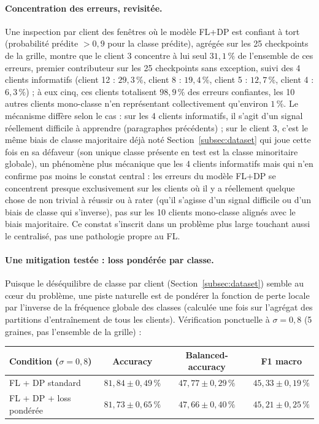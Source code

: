 \documentclass{article}
\begin{document}
\paragraph{Concentration des erreurs, revisitée.} Une inspection par client des
fenêtres où le modèle FL+DP est confiant à tort (probabilité prédite $>0{,}9$ pour la
classe prédite), agrégée sur les 25 checkpoints de la grille, montre que le client 3
concentre à lui seul $31{,}1\,\%$ de l'ensemble de ces erreurs, premier contributeur
sur les 25 checkpoints sans exception, suivi des 4 clients informatifs (client 12 :
$29{,}3\,\%$, client 8 : $19{,}4\,\%$, client 5 : $12{,}7\,\%$, client 4 : $6{,}3\,\%$) ;
à eux cinq, ces clients totalisent $98{,}9\,\%$ des erreurs confiantes, les 10 autres
clients mono-classe n'en représentant collectivement qu'environ $1\,\%$. Le mécanisme
diffère selon le cas : sur les 4 clients informatifs, il s'agit d'un signal réellement
difficile à apprendre (paragraphes précédents) ; sur le client 3, c'est le même biais
de classe majoritaire déjà noté Section~\ref{subsec:dataset} qui joue cette fois en sa
défaveur (son unique classe présente en test est la classe minoritaire globale), un
phénomène plus mécanique que les 4 clients informatifs mais qui n'en confirme pas moins
le constat central : les erreurs du modèle FL+DP se concentrent presque exclusivement
sur les clients où il y a réellement quelque chose de non trivial à réussir ou à rater
(qu'il s'agisse d'un signal difficile ou d'un biais de classe qui s'inverse), pas sur
les 10 clients mono-classe alignés avec le biais majoritaire. Ce constat s'inscrit dans
un problème plus large touchant aussi le centralisé, pas une pathologie propre au FL.

\paragraph{Une mitigation testée : loss pondérée par classe.} Puisque le déséquilibre
de classe par client (Section~\ref{subsec:dataset}) semble au cœur du problème, une
piste naturelle est de pondérer la fonction de perte locale par l'inverse de la
fréquence globale des classes (calculée une fois sur l'agrégat des partitions
d'entraînement de tous les clients). Vérification ponctuelle à $\sigma=0{,}8$
(5 graines, pas l'ensemble de la grille) :

\begin{center}
\begin{tabular}{lccc}
  \toprule
  Condition ($\sigma=0{,}8$) & Accuracy & Balanced-accuracy & F1 macro \\
  \midrule
  FL + DP standard        & $81{,}84 \pm 0{,}49\,\%$ & $47{,}77 \pm 0{,}29\,\%$ & $45{,}33 \pm 0{,}19\,\%$ \\
  FL + DP + loss pondérée & $81{,}73 \pm 0{,}65\,\%$ & $47{,}66 \pm 0{,}40\,\%$ & $45{,}21 \pm 0{,}25\,\%$ \\
  \bottomrule
\end{tabular}
\end{center}
\end{document}

